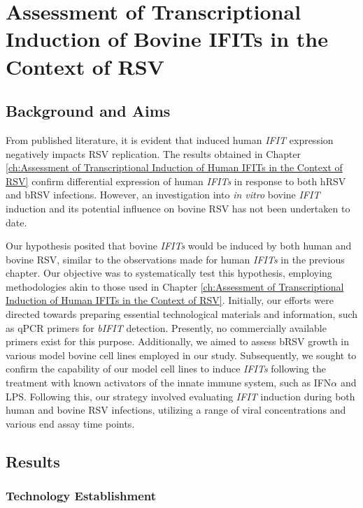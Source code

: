 \chapter{Assessment of Transcriptional Induction of Bovine IFITs in the Context of RSV} \label{ch:Assessment of Transcriptional Induction of Bovine IFITs in the Context of RSV}
\section{Background and Aims} \label{sec:Background and Aims Chapter2}
From published literature, it is evident that induced human \textit{IFIT} expression negatively impacts RSV replication. The results obtained in Chapter \ref{ch:Assessment of Transcriptional Induction of Human IFITs in the Context of RSV} confirm differential expression of human \textit{IFITs} in response to both hRSV and bRSV infections. However, an investigation into \textit{in vitro} bovine \textit{IFIT} induction and its potential influence on bovine RSV has not been undertaken to date.

Our hypothesis posited that bovine \textit{IFITs} would be induced by both human and bovine RSV, similar to the observations made for human \textit{IFITs} in the previous chapter. Our objective was to systematically test this hypothesis, employing methodologies akin to those used in Chapter \ref{ch:Assessment of Transcriptional Induction of Human IFITs in the Context of RSV}. Initially, our efforts were directed towards preparing essential technological materials and information, such as qPCR primers for \textit{bIFIT} detection. Presently, no commercially available primers exist for this purpose. Additionally, we aimed to assess bRSV growth in various model bovine cell lines employed in our study. Subsequently, we sought to confirm the capability of our model cell lines to induce \textit{IFITs} following the treatment with known activators of the innate immune system, such as IFN\(\alpha\) and LPS. Following this, our strategy involved evaluating \textit{IFIT} induction during both human and bovine RSV infections, utilizing a range of viral concentrations and various end assay time points.

\section{Results} \label{sec:Results Chapter2}
\subsection{Technology Establishment} \label{subsec:Technology Establishment}
